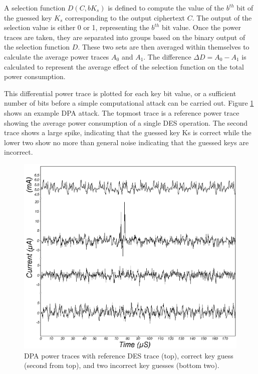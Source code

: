 \documentclass[conference, 12pt]{IEEEtran}
\newcommand{\x}{1}						%
\begin{document}
		A selection function $D(C, b K_s)$ is defined to compute the value of the $b^{th}$ bit of the guessed key $K_s$ corresponding to the output ciphertext $C$. The output of the selection value is either 0 or 1, representing the $b^{th}$ bit value. Once the power traces are taken, they are separated into groups based on the binary output of the selection function $D$. These two sets are then averaged within themselves to calculate the average power traces $A_0$ and $A_1$. The difference $\Delta D = A_0-A_1$ is calculated to represent the average effect of the selection function on the total power consumption. 

		This differential power trace is plotted for each key bit value, or a sufficient number of bits before a simple computational attack can be carried out. Figure \ref{DPA} shows an example DPA attack. The topmost trace is a reference power trace showing the average power consumption of a single DES operation. The second trace shows a large spike, indicating that the guessed key Ks is correct while the lower two show no more than general noise indicating that the guessed keys are incorrect. 

		\begin{figure}[tbp]
			\centering
			\includegraphics[width=\x\linewidth]{ReportFiles/DPA.png}
			\caption{DPA power traces with reference DES trace (top), correct key guess (second from top), and two incorrect key guesses (bottom two).\cite{b7}}
			\label{DPA}
		\end{figure}
\end{document}

